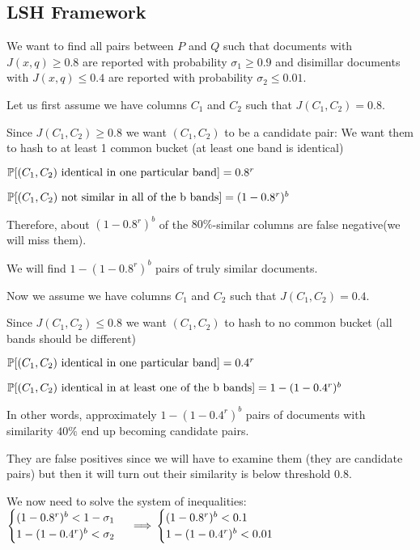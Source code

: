 \subsection{LSH Framework}
We want to find all pairs between $P$ and $Q$ such that documents with $J(x,q) \ge 0.8$ are reported with probability $\sigma_1\ge 0.9$ and disimillar documents with $J(x,q) \le 0.4$ are reported with probability $\sigma_2\le 0.01$.

Let us first assume we have columns $C_1$ and $C_2$ such that $J(C_1,C_2)=0.8$.

Since $J(C_1,C_2)\ge 0.8$ we want $(C_1,C_2)$ to be a candidate pair: We want them to hash to at least 1 common bucket (at least one band is identical)

$\P{(C_1,C_2) \text{ identical in one particular band}} = 0.8^r$

$\P{(C_1,C_2) \text{ not similar in all of the b bands}} = (1-0.8^r)^b$

Therefore, about $(1-0.8^r)^b$ of the $80\%$-similar columns are false negative(we will miss them).

We will find $1-(1-0.8^r)^b$ pairs of truly similar documents.

Now we assume we have columns $C_1$ and $C_2$ such that $J(C_1,C_2)=0.4$.

Since $J(C_1,C_2)\le 0.8$ we want $(C_1,C_2)$ to hash to no common bucket (all bands should be different)

$\P{(C_1,C_2) \text{ identical in one particular band}} = 0.4^r$

$\P{(C_1,C_2) \text{ identical in at least one of the b bands}} = 1 - (1-0.4^r)^b$

In other words, approximately $ 1 - (1-0.4^r)^b$ pairs of documents with similarity $40\%$ end up becoming candidate pairs.

They are false positives since we will have to examine them (they are candidate pairs) but then it will turn out their similarity is below threshold 0.8.

We now need to solve the system of inequalities:
$
\begin{cases}
	(1-0.8^r)^b<1-\sigma_1\\
	1 - (1-0.4^r)^b<\sigma_2
\end{cases}
\implies\\
\begin{cases}
	(1-0.8^r)^b<0.1\\
	1 - (1-0.4^r)^b<0.01
\end{cases}
$

